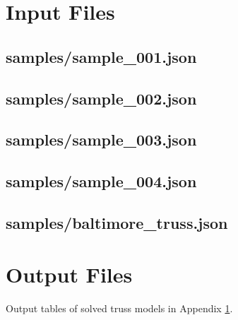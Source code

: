 \documentclass{article}
\begin{document}
\begin{appendices}




\newpage
\section{Input Files}\label{app:input_files}

\subsection{samples/sample\_001.json}\label{app:samples/sample_001.json}


\subsection{samples/sample\_002.json}\label{app:samples/sample_002.json}


\subsection{samples/sample\_003.json}\label{app:samples/sample_003.json}


\subsection{samples/sample\_004.json}\label{app:samples/sample_004.json}


\subsection{samples/baltimore\_truss.json}\label{app:samples/baltimore_truss.json}




\newpage
\section{Output Files}\label{app:output_files}

Output tables of solved truss models in Appendix \ref{app:input_files}.



\end{appendices}
\end{document}
